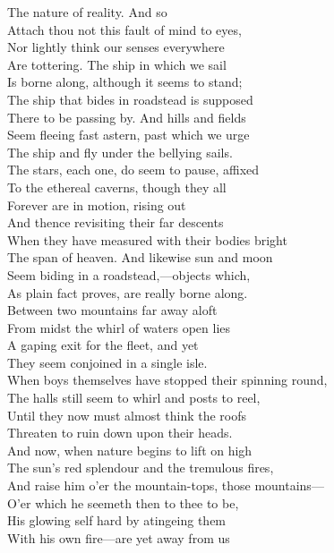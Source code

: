 The nature of reality. And so\\
Attach thou not this fault of mind to eyes,\\
Nor lightly think our senses everywhere\\
Are tottering. The ship in which we sail\\
Is borne along, although it seems to stand;\\
The ship that bides in roadstead is supposed\\
There to be passing by. And hills and fields\\
Seem fleeing fast astern, past which we urge\\
The ship and fly under the bellying sails.\\
The stars, each one, do seem to pause, affixed\\
To the ethereal caverns, though they all\\
Forever are in motion, rising out\\
And thence revisiting their far descents\\
When they have measured with their bodies bright\\
The span of heaven. And likewise sun and moon\\
Seem biding in a roadstead,—objects which,\\
As plain fact proves, are really borne along.\\
Between two mountains far away aloft\\
From midst the whirl of waters open lies\\
A gaping exit for the fleet, and yet\\
They seem conjoined in a single isle.\\
When boys themselves have stopped their spinning round,\\
The halls still seem to whirl and posts to reel,\\
Until they now must almost think the roofs\\
Threaten to ruin down upon their heads.\\
And now, when nature begins to lift on high\\
The sun's red splendour and the tremulous fires,\\
And raise him o'er the mountain-tops, those mountains—\\
O'er which he seemeth then to thee to be,\\
His glowing self hard by atingeing them\\
With his own fire—are yet away from us\\
